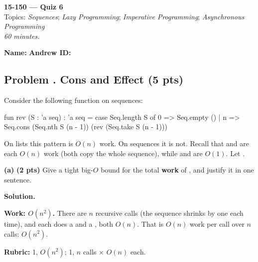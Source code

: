 \documentclass[crop=false]{standalone}
\newif\ifsol
\newenvironment{solution}
    {\par\color{solution_color}\begin{framed}\textbf{Solution.}\par}
    {\end{framed}}
\newcommand{\quizproblem}[3]{%
  \needspace{5\baselineskip}%
  \stepcounter{problem}%
  \ifsol
    \subsection*{Problem \arabic{problem}. #1 \hfill \timing{#2} \quad (#3 pts)}%
  \else
    \subsection*{Problem \arabic{problem}. #1 \hfill (#3 pts)}%
  \fi
}
\newcommand{\subpts}[1]{\textbf{(#1 pts)}}
\newcommand{\answerspace}[1]{\ifsol\else\vspace{#1}\par\fi}
\begin{document}
\begin{center}
  {\Large \textbf{15-150 --- Quiz 6}} \\
  \vspace{4pt}
  Topics: \textit{Sequences}; \textit{Lazy Programming};
  \textit{Imperative Programming}; \textit{Asynchronous Programming} \\
  \vspace{4pt}
  \textit{60 minutes.}
\end{center}

\vspace{1em}

\noindent\textbf{Name:} \hrulefill \hspace{2em} \textbf{Andrew ID:} \hrulefill

\vspace{1em}


\quizproblem{Cons and Effect}{8}{5}

Consider the following function on sequences:

\begin{codeblock}
  fun rev (S : 'a seq) : 'a seq =
    case Seq.length S of
      0 => Seq.empty ()
    | n => Seq.cons (Seq.nth S (n - 1)) (rev (Seq.take S (n - 1)))
\end{codeblock}

On lists this pattern is $O(n)$ work. On sequences it is not. Recall that
 and  are each $O(n)$ work (both copy the
whole sequence), while  and  are $O(1)$.
Let .

\textbf{(a)} \subpts{2} Give a tight big-$O$ bound for the total
\textbf{work} of , and justify it in one sentence.

\answerspace{4cm}

\begin{solution}
\textbf{Work: $O(n^2)$.} There are $n$ recursive calls (the sequence
shrinks by one each time), and each does a  and a
, both $O(n)$. That is $O(n)$ work per call over $n$
calls: $O(n^2)$.

\textbf{Rubric:} 1, $O(n^2)$; 1, $n$ calls $\times$ $O(n)$ each.
\end{solution}
\end{document}
